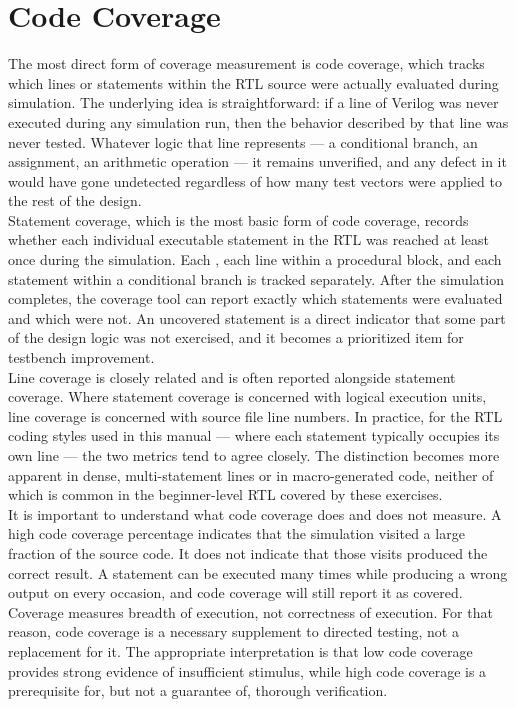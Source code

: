 \section{Code Coverage}
\label{sec:code-coverage}

The most direct form of coverage measurement is code coverage, which tracks which lines or statements within the RTL source were actually evaluated during simulation. The underlying idea is straightforward: if a line of Verilog was never executed during any simulation run, then the behavior described by that line was never tested. Whatever logic that line represents — a conditional branch, an assignment, an arithmetic operation — it remains unverified, and any defect in it would have gone undetected regardless of how many test vectors were applied to the rest of the design.\\

Statement coverage, which is the most basic form of code coverage, records whether each individual executable statement in the RTL was reached at least once during the simulation. Each , each line within a procedural block, and each statement within a conditional branch is tracked separately. After the simulation completes, the coverage tool can report exactly which statements were evaluated and which were not. An uncovered statement is a direct indicator that some part of the design logic was not exercised, and it becomes a prioritized item for testbench improvement.\\

Line coverage is closely related and is often reported alongside statement coverage. Where statement coverage is concerned with logical execution units, line coverage is concerned with source file line numbers. In practice, for the RTL coding styles used in this manual — where each statement typically occupies its own line — the two metrics tend to agree closely. The distinction becomes more apparent in dense, multi-statement lines or in macro-generated code, neither of which is common in the beginner-level RTL covered by these exercises.\\

It is important to understand what code coverage does and does not measure. A high code coverage percentage indicates that the simulation visited a large fraction of the source code. It does not indicate that those visits produced the correct result. A statement can be executed many times while producing a wrong output on every occasion, and code coverage will still report it as covered. Coverage measures breadth of execution, not correctness of execution. For that reason, code coverage is a necessary supplement to directed testing, not a replacement for it. The appropriate interpretation is that low code coverage provides strong evidence of insufficient stimulus, while high code coverage is a prerequisite for, but not a guarantee of, thorough verification.\\

